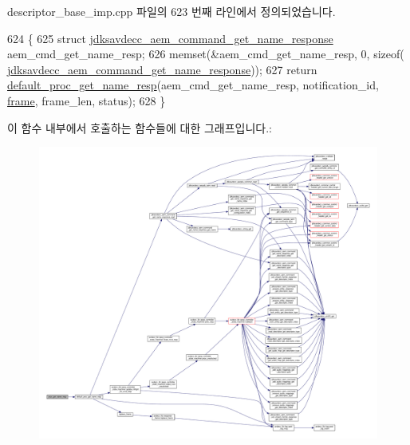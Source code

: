 descriptor\+\_\+base\+\_\+imp.\+cpp 파일의 623 번째 라인에서 정의되었습니다.


\begin{DoxyCode}
624 \{
625     \textcolor{keyword}{struct }\hyperlink{structjdksavdecc__aem__command__get__name__response}{jdksavdecc\_aem\_command\_get\_name\_response} 
      aem\_cmd\_get\_name\_resp;
626     memset(&aem\_cmd\_get\_name\_resp, 0, \textcolor{keyword}{sizeof}(
      \hyperlink{structjdksavdecc__aem__command__get__name__response}{jdksavdecc\_aem\_command\_get\_name\_response}));
627     \textcolor{keywordflow}{return} \hyperlink{classavdecc__lib_1_1descriptor__base__imp_acc8b1c1591bd54bc9a2d21d4f0db2e86}{default\_proc\_get\_name\_resp}(aem\_cmd\_get\_name\_resp, notification\_id, 
      \hyperlink{gst__avb__playbin_8c_ac8e710e0b5e994c0545d75d69868c6f0}{frame}, frame\_len, status);
628 \}
\end{DoxyCode}


이 함수 내부에서 호출하는 함수들에 대한 그래프입니다.\+:
\nopagebreak
\begin{figure}[H]
\begin{center}
\leavevmode
\includegraphics[width=350pt]{classavdecc__lib_1_1descriptor__base__imp_ac4e290a88039a8e4915f7b9f8738881f_cgraph}
\end{center}
\end{figure}




